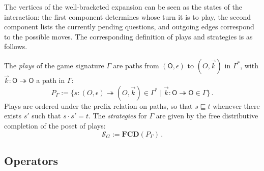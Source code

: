 \documentclass[format=sigplan,authordraft]{acmart}
\newcommand{\kw}[1]{\ensuremath{ \mathsf{#1} }}
\begin{document}
The vertices of the well-bracketed expansion can be
seen as the states of the interaction:
the first component determines whose turn it is to play,
the second component lists the currently pending questions,
and outgoing edges correspond to the possible moves.
The corresponding definition of
plays and strategies is as follows.

\begin{definition}
The \emph{plays} of the game signature $\Gamma$ are
paths from $(\kw{O}, \epsilon)$ to $(O, \vec{k})$ in $\Gamma^*$,
with $\vec{k} : \kw{O} \twoheadrightarrow \kw{O}$ a path in $\Gamma$:
\[
    P_\Gamma := \{ s : (O, \epsilon) \twoheadrightarrow (O, \vec{k}) \in \Gamma^*
      \mid \vec{k} : \kw{O} \twoheadrightarrow \kw{O} \in \Gamma \} \,.
\]
Plays are ordered under the prefix relation on paths,
so that $s \sqsubseteq t$ whenever there exists
$s'$ such that $s \cdot s' = t$.
The \emph{strategies} for $\Gamma$
are given by the free distributive completion
of the poset of plays:
\[
    \mathcal{S}_G := \mathbf{FCD}(P_\Gamma) \,.
\]
\end{definition}


\subsection{Operators} %
\end{document}
